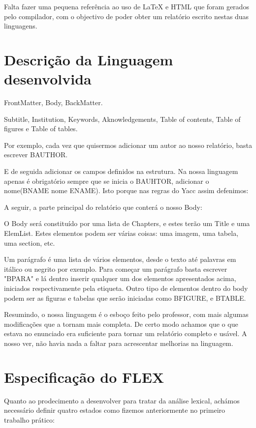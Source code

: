 \documentclass[12pt,letterpaper]{article}
\begin{document}
Falta fazer uma pequena referência ao uso de LaTeX e HTML que foram gerados pelo compilador, com o objectivo de poder obter um relatório escrito nestas duas linguagens.

\newpage
\section{Descrição da Linguagem desenvolvida}
FrontMatter, Body, BackMatter.

Subtitle, Institution, Keywords, Aknowledgements, Table of contents, Table of figures e Table of tables.

Por exemplo, cada vez que quisermos adicionar um autor ao nosso relatório, basta escrever BAUTHOR.

E de seguida adicionar os campos definidos na estrutura. Na nossa linguagem apenas é obrigatório sempre que se inicia o BAUHTOR, adicionar o nome(BNAME nome ENAME). Isto porque nas regras do Yacc assim defenimos:

A seguir, a parte principal do relatório que conterá o nosso Body:

O Body será constituído por uma lista de Chapters, e estes terão um Title e uma ElemList. Estes elementos podem ser várias coisas: uma imagem, uma tabela, uma section, etc.

Um parágrafo é uma lista de vários elementos, desde o texto até palavras em itálico ou negrito por exemplo. Para começar um parágrafo basta escrever "BPARA" e lá dentro inserir qualquer um dos elementos apresentados acima, iniciados respectivamente pela etiqueta. Outro tipo de elementos dentro do body podem ser as figuras e tabelas que serão iniciadas como BFIGURE, e BTABLE.

Resumindo, o nossa linguagem é o esboço feito pelo professor, com mais algumas modificações que a tornam mais completa. De certo modo achamos que o que estava no enunciado era suficiente para tornar um relatório completo e usável. A nosso ver, não havia nada a faltar para acrescentar melhorias na linguagem.

\newpage
\section{Especificação do FLEX}
Quanto ao prodecimento a desenvolver para tratar da análise lexical, achámos necessário definir quatro estados como fizemos anteriormente no primeiro trabalho prático:
\end{document}
